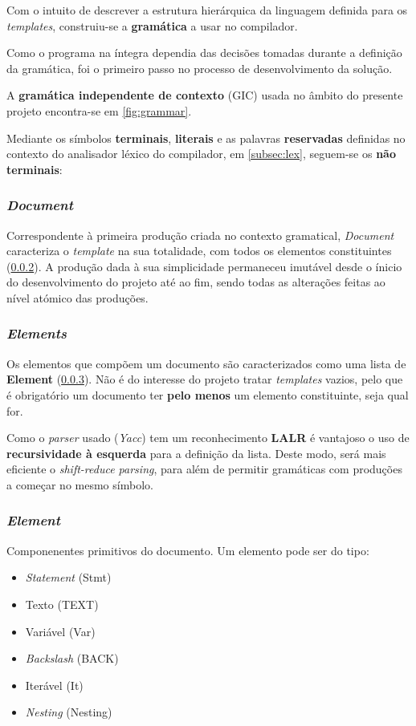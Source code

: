 \documentclass[../relatorio.tex]{subfiles}
\begin{document}
Com o intuito de descrever a estrutura hierárquica da linguagem
definida para os \textit{templates}, construiu-se a \textbf{gramática} 
a usar no compilador. 

Como o programa na íntegra dependia das decisões tomadas durante
a definição da gramática, foi o primeiro passo no processo de desenvolvimento
da solução. 

A \textbf{gramática independente de contexto} (GIC) usada 
no âmbito do presente projeto encontra-se em \ref{fig:grammar}.

Mediante os símbolos \textbf{terminais}, \textbf{literais} e as palavras 
\textbf{reservadas} definidas no contexto do analisador léxico do 
compilador, em \ref{subsec:lex}, seguem-se os \textbf{não terminais}:

\subsubsection{\textit{Document}}\label{grm:doc}
Correspondente à primeira produção criada no contexto gramatical,
\textit{Document} caracteriza o \textit{template} na sua totalidade,
com todos os elementos constituintes (\ref{grm:elems}).
A produção dada à sua simplicidade permaneceu imutável desde o ínicio
do desenvolvimento do projeto até ao fim, sendo todas as alterações 
feitas ao nível atómico das produções.

\subsubsection{\textit{Elements}} \label{grm:elems}
Os elementos que compõem um documento são caracterizados como uma lista 
de \textbf{Element} (\ref{grm:elem}). 
Não é do interesse do projeto tratar \textit{templates} vazios, pelo que 
é obrigatório um documento ter \textbf{pelo menos} um 
elemento constituinte, seja qual for. 

Como o \textit{parser} usado (\textit{Yacc}) tem um reconhecimento \textbf{LALR}
é vantajoso o uso de \textbf{recursividade à esquerda} para a definição da lista.
Deste modo, será mais eficiente o \textit{shift-reduce parsing}, para além
de permitir gramáticas com produções a começar no mesmo símbolo.

\subsubsection{\textit{Element}}\label{grm:elem}
Componenentes primitivos do documento. 
Um elemento pode ser do tipo:
\begin{itemize}
    \item \textit{Statement}    (Stmt)
    \item Texto                 (TEXT)
    \item Variável              (Var)
    \item \textit{Backslash}    (BACK)
    \item Iterável              (It)
    \item \textit{Nesting}      (Nesting)
\end{itemize}
\end{document}
